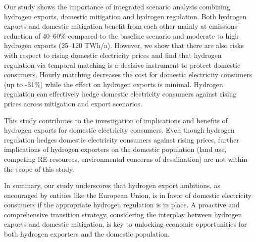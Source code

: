 



Our study shows the importance of integrated scenario analysis combining hydrogen exports, domestic mitigation and hydrogen regulation.
Both hydrogen exports and domestic mitigation benefit from each other mainly at emissions reduction of 40--60\% compared to the baseline scenario and moderate to high hydrogen exports (25--120 TWh/a).
However, we show that there are also risks with respect to rising domestic electricity prices
and find that hydrogen regulation via temporal matching is a decisive instrument
to protect domestic consumers. Hourly matching decreases the cost for domestic electricity consumers (up to -31\%) while the effect on hydrogen exports is minimal. Hydrogen regulation can effectively hedge domestic electricity consumers against rising prices across mitigation and export scenarios. %

This study contributes to the investigation of implications and benefits of hydrogen exports for domestic electricity consumers. Even though hydrogen regulation hedges domestic electricity consumers against rising prices, further implications of hydrogen exporters on the domestic population (land use, competing RE resources, environmental concerns of desalination) are not within the scope of this study.

In summary, our study underscores that hydrogen export ambitions, as encouraged by entities like the European Union, is in favor of domestic electricity consumers 
if the appropriate hydrogen regulation is in place. A proactive and comprehensive transition strategy, considering the interplay between hydrogen exports and domestic mitigation, is key to unlocking economic opportunities for both hydrogen exporters and the domestic population. 


